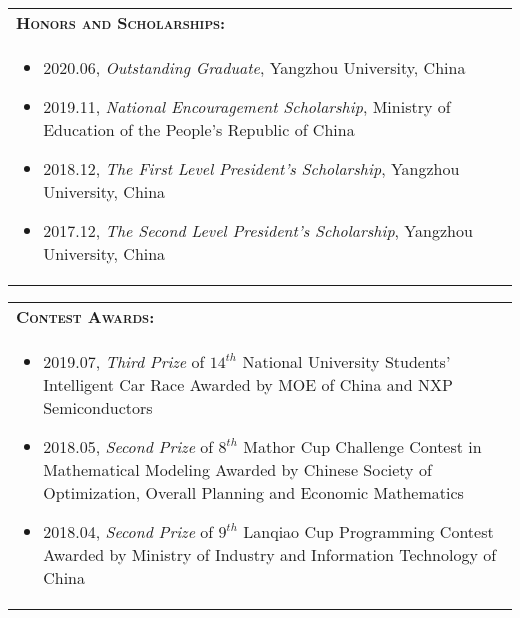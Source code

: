 \documentclass{resume}
\begin{document}

\begin{tabular*}{15.2cm}{l@{\extracolsep{\fill}}}
  \textsc{\textbf{Honors and Scholarships:}}\\
  \multicolumn{1}{p{15.4cm}}{
    \vspace{-0.2cm}
  \begin{itemize}
    \item 2020.06, \emph{Outstanding Graduate}, Yangzhou University, China
    \item 2019.11, \emph{National Encouragement Scholarship}, Ministry of Education of the People's Republic of China
    \item 2018.12, \emph{The First Level President's Scholarship}, Yangzhou University, China
    \item 2017.12, \emph{The Second Level President's Scholarship}, Yangzhou University, China
      \end{itemize}}
  \end{tabular*}

  \vspace{-0.4cm}

\begin{tabular*}{15.2cm}{l@{\extracolsep{\fill}}}
    \textsc{\textbf{Contest Awards:}}\\
    \multicolumn{1}{p{15.4cm}}{
    \vspace{-0.2cm}
    \begin{itemize}
      \item 2019.07, \textit{Third Prize} of $14^{th}$ National University Students' Intelligent Car Race \newline Awarded by MOE of China and NXP Semiconductors
      \item 2018.05, \textit{Second Prize} of $8^{th}$ Mathor Cup Challenge Contest in Mathematical Modeling
      \newline Awarded by Chinese Society of Optimization, Overall Planning and Economic Mathematics
      \item 2018.04, \textit{Second Prize} of $9^{th}$ Lanqiao Cup Programming Contest
      \newline Awarded by Ministry of Industry and Information Technology of China
        \end{itemize}}
\end{tabular*}

  
    
\end{document}
